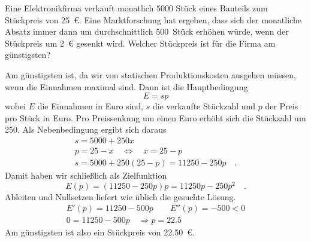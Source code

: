 \documentclass[auto-toc=false,babel=ngerman]{arbeitsblatt}
\begin{document}
\begin{question}
  Eine Elektronikfirma verkauft monatlich 5000 Stück eines Bauteils zum
  Stückpreis von \SI{25}{€}.  Eine Marktforschung hat ergeben, dass sich der
  monatliche Absatz immer dann um durchschnittlich 500~Stück erhöhen würde,
  wenn der Stückpreis um \SI{2}{€} gesenkt wird.  Welcher Stückpreis ist für
  die Firma am günstigsten?
\end{question}
\begin{solution}
  Am günstigsten ist, da wir von statischen Produktionskosten ausgehen müssen,
  wenn die Einnahmen maximal sind.  Dann ist die Hauptbedingung
  \[ E = sp \]
  wobei $E$ die Einnahmen in Euro sind, $s$ die verkaufte Stückzahl und $p$
  der Preis pro Stück in Euro.  Pro Preissenkung um einen Euro erhöht sich die
  Stückzahl um 250.  Als Nebenbedingung ergibt sich daraus
  \begin{gather*}
    s = 5000 + 250x \\
    p = 25-x \quad\Leftrightarrow\quad x = 25 -p \\
    s = 5000 + 250(25-p) = 11250 - 250p \quad.
  \end{gather*}
  Damit haben wir schließlich als Zielfunktion
  \[ E(p) = (11250 - 250p)p = 11250p - 250p^2 \quad. \]
  Ableiten und Nullsetzen liefert wie üblich die gesuchte Lösung.
  \begin{gather*}
    E'(p) = 11250 -500p \qquad  E''(p) = -500<0 \\
    0 = 11250 -500p \quad\Rightarrow
    p = 22.5
  \end{gather*}
  Am günstigsten ist also ein Stückpreis von
  \SI[round-mode=places,round-precision=2]{22.50}{€}.
\end{solution}

\printsolutions
\end{document}
